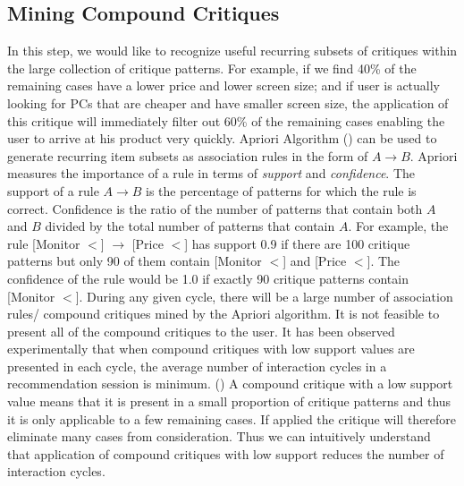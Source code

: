 \subsection{Mining Compound Critiques}
In this step, we would like to recognize useful recurring subsets of critiques within the large collection of critique patterns.
For example, if we find 40\% of the remaining cases have a lower price and lower screen size; and if user is actually looking for PCs that are cheaper and have smaller screen size, the application of this critique will immediately filter out 60\% of the remaining cases enabling the user to arrive at his product very quickly.
Apriori Algorithm (\cite{aprioriAlgo}) can be used to generate recurring item subsets as association rules in the form of $A \rightarrow B$.
Apriori measures the importance of a rule in terms of \textit{support} and \textit{confidence}.
The support of a rule $A \rightarrow B$ is the percentage of patterns for which the rule is correct.
Confidence is the ratio of the number of patterns that contain both $A$ and $B$ divided by the total number of patterns that contain $A$.
For example, the rule [Monitor $<$] $\rightarrow$ [Price $<$] has support 0.9 if there are 100 critique patterns but only 90 of them contain [Monitor $<$] and [Price $<$]. The confidence of the rule would be 1.0 if exactly 90 critique patterns contain [Monitor $<$].
During any given cycle, there will be a large number of association rules/ compound critiques mined by the Apriori algorithm.
It is not feasible to present all of the compound critiques to the user.
It has been observed experimentally that when compound critiques with low support values are presented in each cycle, the average number of interaction cycles in a recommendation session is minimum.
 (\cite{mccarthy2004dynamic})
A compound critique with a low support value means that it is present in a small proportion of critique patterns and thus it is only applicable to a few remaining cases. 
If applied the critique will therefore eliminate many cases from consideration.
Thus we can intuitively understand that application of compound critiques with low support reduces the number of interaction cycles.



